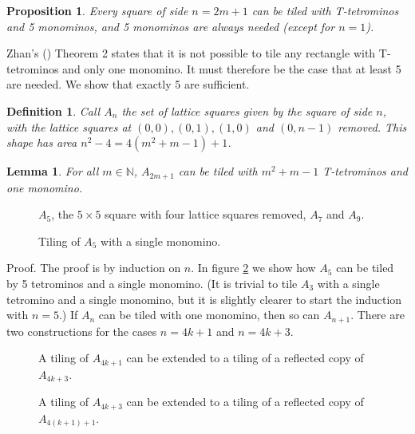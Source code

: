 \documentclass{article}
\theoremstyle{plain}
\newtheorem{proposition}[theorem]{Proposition}
\newtheorem{lemma}[theorem]{Lemma}
\newtheorem{definition}[theorem]{Definition}
\begin{document}
\begin{proposition}\label{odd}
Every square of side $n = 2m + 1$ can be tiled with T-tetrominos and 5 monominos, and 5 monominos are always needed (except for $n = 1$).
\end{proposition}
Zhan's (\cite{zhan}) Theorem 2 states that it is not possible to tile any rectangle with T-tetrominos and only one monomino. It must therefore be the case that at least 5 are needed. We show that exactly 5 are sufficient.

\begin{definition}
Call $A_n$ the set of lattice squares given by the square of side $n$, with the lattice squares at $(0, 0), (0,1), (1, 0)$ and $(0, n-1)$ removed.
This shape has area $n^2 - 4 = 4(m^2 + m - 1) + 1$.
\end{definition}

\begin{lemma}
For all $m \in \mathbb{N}$, $A_{2m+1}$ can be tiled with $m^2 + m - 1$ T-tetrominos and one monomino.
\end{lemma}

\begin{figure}

\caption{$A_5$, the $5 \times 5$ square with four lattice squares removed, $A_7$ and $A_9$.}
\label{cropped}
\end{figure}

\begin{figure}

\caption{Tiling of $A_5$ with a single monomino.}
\label{five}
\end{figure}

{\sc Proof.}
The proof is by induction on $n$. In figure \ref{five} we show how $A_5$ can be tiled by 5 tetrominos and a single monomino. (It is trivial to tile $A_3$ with a single tetromino and a single monomino, but it is slightly clearer to start the induction with $n=5$.) If $A_n$ can be tiled with one monomino, then so can $A_{n+1}$. There are two constructions for the cases $n=4k+1$ and $n=4k+3$.

\begin{figure}

\caption{A tiling of $A_{4k+1}$ can be extended to a tiling of a reflected copy of $A_{4k+3}$.}
\label{ones}
\end{figure}

\begin{figure}

\caption{A tiling of $A_{4k+3}$ can be extended to a tiling of a reflected copy of $A_{4(k+1)+1}$.}
\label{threes}
\end{figure}

{}

\end{document}

